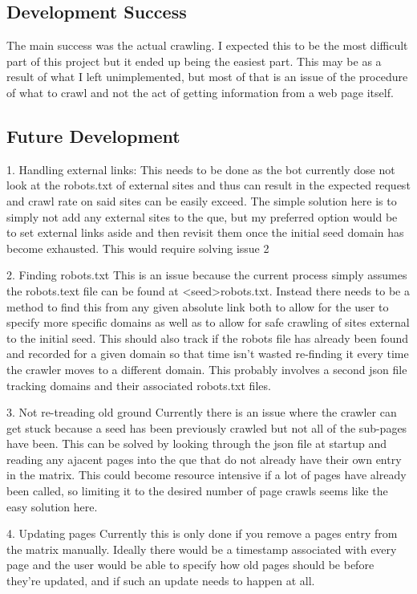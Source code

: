 \documentclass[12pt, letterpaper]{article}
\begin{document}
\subsection{Development Success}
The main success was the actual crawling. I expected this to be the most difficult part of this project but it ended up being the easiest part. This may be as a result of what I left unimplemented, but most of that is an issue of the procedure of what to crawl and not the act of getting information from a web page itself.

\subsection{Future Development}
1. Handling external links:
This needs to be done as the bot currently dose not look at the robots.txt of external sites and thus can result in the expected request and crawl rate on said sites can be easily exceed. The simple solution here is to simply not add any external sites to the que, but my preferred option would be to set external links aside and then revisit them once the initial seed domain has become exhausted. This would require solving issue 2

2. Finding robots.txt
This is an issue because the current process simply assumes the robots.text file can be found at <seed>robots.txt. Instead there needs to be a method to find this from any given absolute link both to allow for the user to specify more specific domains as well as to allow for safe crawling of sites external to the initial seed. This should also track if the robots file has already been found and recorded for a given domain so that time isn't wasted re-finding it every time the crawler moves to a different domain. This probably involves a second json file tracking domains and their associated robots.txt files.

3. Not re-treading old ground
Currently there is an issue where the crawler can get stuck because a seed has been previously crawled but not all of the sub-pages have been. This can be solved by looking through the json file at startup and reading any ajacent pages into the que that do not already have their own entry in the matrix. This could become resource intensive if a lot of pages have already been called, so limiting it to the desired number of page crawls seems like the easy solution here.
 
4. Updating pages
Currently this is only done if you remove a pages entry from the matrix manually. Ideally there would be a timestamp associated with every page and the user would be able to specify how old pages should be before they're updated, and if such an update needs to happen at all.
\end{document}
